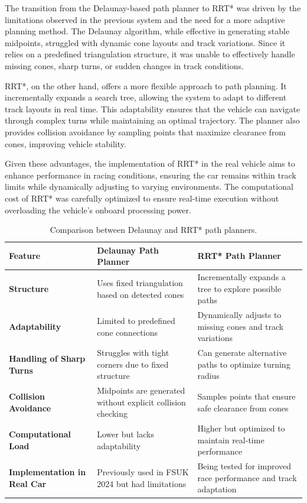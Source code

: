 \documentclass[a4paper,11pt]{report}
\begin{document}
The transition from the Delaunay-based path planner to RRT* was driven by the limitations observed in the previous system and the need for a more adaptive planning method. The Delaunay algorithm, while effective in generating stable midpoints, struggled with dynamic cone layouts and track variations. Since it relies on a predefined triangulation structure, it was unable to effectively handle missing cones, sharp turns, or sudden changes in track conditions.

RRT*, on the other hand, offers a more flexible approach to path planning. It incrementally expands a search tree, allowing the system to adapt to different track layouts in real time. This adaptability ensures that the vehicle can navigate through complex turns while maintaining an optimal trajectory. The planner also provides collision avoidance by sampling points that maximize clearance from cones, improving vehicle stability.

Given these advantages, the implementation of RRT* in the real vehicle aims to enhance performance in racing conditions, ensuring the car remains within track limits while dynamically adjusting to varying environments. The computational cost of RRT* was carefully optimized to ensure real-time execution without overloading the vehicle’s onboard processing power.

\begin{table}[h]
    \centering
    \small
    \begin{tabular}{|p{4cm}|p{6cm}|p{6cm}|}
        \hline
        \textbf{Feature} & \textbf{Delaunay Path Planner} & \textbf{RRT* Path Planner} \\
        \hline
        \textbf{Structure} & Uses fixed triangulation based on detected cones & Incrementally expands a tree to explore possible paths \\
        \hline
        \textbf{Adaptability} & Limited to predefined cone connections & Dynamically adjusts to missing cones and track variations \\
        \hline
        \textbf{Handling of Sharp Turns} & Struggles with tight corners due to fixed structure & Can generate alternative paths to optimize turning radius \\
        \hline
        \textbf{Collision Avoidance} & Midpoints are generated without explicit collision checking & Samples points that ensure safe clearance from cones \\
        \hline
        \textbf{Computational Load} & Lower but lacks adaptability & Higher but optimized to maintain real-time performance \\
        \hline
        \textbf{Implementation in Real Car} & Previously used in FSUK 2024 but had limitations & Being tested for improved race performance and track adaptation \\
        \hline
    \end{tabular}
    \caption{Comparison between Delaunay and RRT* path planners.}
    \label{tab:delaunay_vs_rrt}
\end{table}
\end{document}
